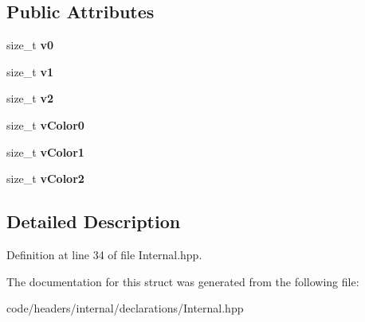 \subsection*{Public Attributes}
\begin{DoxyCompactItemize}
\item 
\mbox{\label{structprzurro_1_1_triangle___index_af5b5c9ba8e196bc0bb90ceeb5d478f95}} 
size\+\_\+t {\bfseries v0}
\item 
\mbox{\label{structprzurro_1_1_triangle___index_a88e3202e75346aae02d9aa70da227cd9}} 
size\+\_\+t {\bfseries v1}
\item 
\mbox{\label{structprzurro_1_1_triangle___index_a2bd3baa9e078ce8a539c17e73cbe3189}} 
size\+\_\+t {\bfseries v2}
\item 
\mbox{\label{structprzurro_1_1_triangle___index_a46eba3d94c50721196b8a1ccd30fbcee}} 
size\+\_\+t {\bfseries v\+Color0}
\item 
\mbox{\label{structprzurro_1_1_triangle___index_aaa2e5f98ca7c077efb193fc4ffd330f6}} 
size\+\_\+t {\bfseries v\+Color1}
\item 
\mbox{\label{structprzurro_1_1_triangle___index_ac8476a70225133fc5d5f44d406f10a56}} 
size\+\_\+t {\bfseries v\+Color2}
\end{DoxyCompactItemize}


\subsection{Detailed Description}


Definition at line 34 of file Internal.\+hpp.



The documentation for this struct was generated from the following file\+:\begin{DoxyCompactItemize}
\item 
code/headers/internal/declarations/Internal.\+hpp\end{DoxyCompactItemize}

